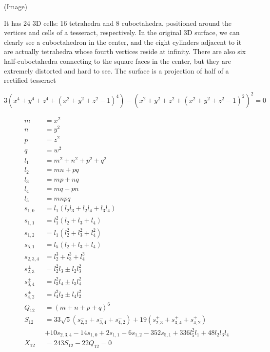 \documentclass{article}
\begin{document}
(Image)

It has 24 3D cells: 16 tetrahedra and 8 cuboctahedra,
positioned around the vertices and cells of a tesseract, respectively.
In the original 3D surface, we can clearly see a cuboctahedron in the center,
and the eight cylinders adjacent to it are actually tetrahedra
whose fourth vertices reside at infinity.
There are also six half-cuboctahedra connecting to the square faces in the center,
but they are extremely distorted and hard to see.
The surface is a projection of half of a rectified tesseract

$$3(x^4+y^4+z^4+(x^2+y^2+z^2-1)^4)-(x^2+y^2+z^2+(x^2+y^2+z^2-1)^2)^2 = 0$$

\begin{align*}
  m &= x^2 \\
  n &= y^2 \\
  p &= z^2 \\
  q &= w^2 \\
  l_1 &= m^2+n^2+p^2+q^2 \\
  l_2 &= mn+pq \\
  l_3 &= mp+nq \\
  l_4 &= mq+pn \\
  l_5 &= mnpq \\
  s_{1,0} &= l_1(l_2l_3+l_2l_4+l_3l_4) \\
  s_{1,1} &= l_1^2(l_2+l_3+l_4) \\
  s_{1,2} &= l_1(l_2^2+l_3^2+l_4^2) \\
  s_{5,1} &= l_5(l_2+l_3+l_4) \\
  s_{2,3,4} &= l_2^3+l_3^3+l_4^3 \\
  s_{2,3}^{\pm} &= l_2^2l_3 \pm l_2l_3^2 \\
  s_{3,4}^{\pm} &= l_3^2l_4 \pm l_3l_4^2 \\
  s_{4,2}^{\pm} &= l_4^2l_2 \pm l_4l_2^2 \\
  Q_{12} &= (m+n+p+q)^6 \\
  S_{12} &= 33\sqrt{5}(s_{2,3}^{-}+s_{3,4}^{-}+s_{4,2}^{-})+19(s_{2,3}^{+}+s_{3,4}^{+}+s_{4,2}^{+}) \\
  &+ 10s_{2,3,4}-14s_{1,0}+2s_{1,1}-6s_{1,2}-352s_{5,1}+336l_5^2l_1+48l_2l_3l_4 \\
  X_{12} &= 243S_{12}-22Q_{12}=0
\end{align*}
\end{document}
